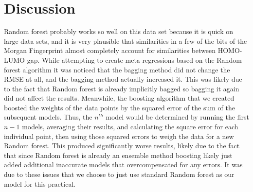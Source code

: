 \documentclass[11pt]{article}
\begin{document}
\section{Discussion}
Random forest probably works so well on this data set because it is quick on large data sets, and it is very plausible that similarities in a few of the bits of the Morgan Fingerprint almost completely account for similarities between HOMO-LUMO gap.
While attempting to create meta-regressions based on the Random forest algorithm it was noticed that the bagging method did not change the RMSE at all, and the bagging method actually increased it. This was likely due to the fact that Random forest is already implicitly bagged so bagging it again did not affect the results. Meanwhile, the boosting algorithm that we created boosted the weights of the data points by the squared error of the sum of the subsequent models. Thus, the $n^{th}$ model would be determined by running the first $n-1$ models, averaging their results, and calculating the square error for each individual point, then using those squared errors to weigh the data for a new Random forest. This produced significantly worse results, likely due to the fact that since Random forest is already an ensemble method boosting likely just added additional inaccurate models that overcompensated for any errors. It was due to these issues that we choose to just use standard Random forest as our model for this practical.
\end{document}
